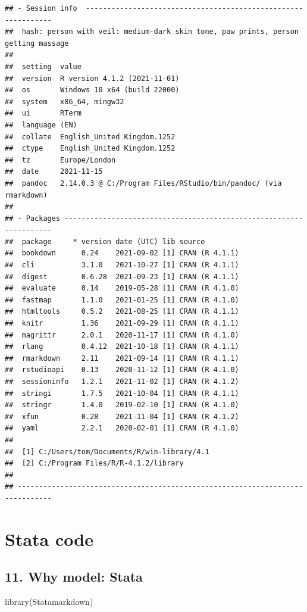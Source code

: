 \documentclass[
  10pt,
]{book}
\newenvironment{Shaded}{\begin{snugshade}}{\end{snugshade}}
\newcommand{\FunctionTok}[1]{\textcolor[rgb]{0.00,0.00,0.00}{#1}}
\newcommand{\NormalTok}[1]{#1}
\begin{document}
\begin{verbatim}
## - Session info  --------------------------------------------------------------
##  hash: person with veil: medium-dark skin tone, paw prints, person getting massage
## 
##  setting  value
##  version  R version 4.1.2 (2021-11-01)
##  os       Windows 10 x64 (build 22000)
##  system   x86_64, mingw32
##  ui       RTerm
##  language (EN)
##  collate  English_United Kingdom.1252
##  ctype    English_United Kingdom.1252
##  tz       Europe/London
##  date     2021-11-15
##  pandoc   2.14.0.3 @ C:/Program Files/RStudio/bin/pandoc/ (via rmarkdown)
## 
## - Packages -------------------------------------------------------------------
##  package     * version date (UTC) lib source
##  bookdown      0.24    2021-09-02 [1] CRAN (R 4.1.1)
##  cli           3.1.0   2021-10-27 [1] CRAN (R 4.1.1)
##  digest        0.6.28  2021-09-23 [1] CRAN (R 4.1.1)
##  evaluate      0.14    2019-05-28 [1] CRAN (R 4.1.0)
##  fastmap       1.1.0   2021-01-25 [1] CRAN (R 4.1.0)
##  htmltools     0.5.2   2021-08-25 [1] CRAN (R 4.1.1)
##  knitr         1.36    2021-09-29 [1] CRAN (R 4.1.1)
##  magrittr      2.0.1   2020-11-17 [1] CRAN (R 4.1.0)
##  rlang         0.4.12  2021-10-18 [1] CRAN (R 4.1.1)
##  rmarkdown     2.11    2021-09-14 [1] CRAN (R 4.1.1)
##  rstudioapi    0.13    2020-11-12 [1] CRAN (R 4.1.0)
##  sessioninfo   1.2.1   2021-11-02 [1] CRAN (R 4.1.2)
##  stringi       1.7.5   2021-10-04 [1] CRAN (R 4.1.1)
##  stringr       1.4.0   2019-02-10 [1] CRAN (R 4.1.0)
##  xfun          0.28    2021-11-04 [1] CRAN (R 4.1.2)
##  yaml          2.2.1   2020-02-01 [1] CRAN (R 4.1.0)
## 
##  [1] C:/Users/tom/Documents/R/win-library/4.1
##  [2] C:/Program Files/R/R-4.1.2/library
## 
## ------------------------------------------------------------------------------
\end{verbatim}

\hypertarget{part-stata-code}{%
\part*{Stata code}\label{part-stata-code}}

\hypertarget{why-model-stata}{%
\chapter*{11. Why model: Stata}\label{why-model-stata}}

\begin{Shaded}
\begin{Highlighting}[]
\FunctionTok{library}\NormalTok{(Statamarkdown)}
\end{Highlighting}
\end{Shaded}
\end{document}
